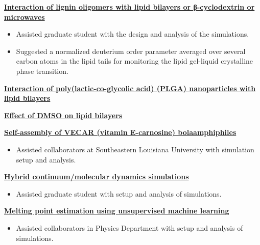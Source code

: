 \begin{cventries}
{\begin{cvitems}
\begin{itemize}
                \end{itemize}
            \item {\textbf{\underline{Interaction of lignin oligomers with lipid bilayers or β-cyclodextrin or microwaves}}}
                \begin{itemize}
                \item {Assisted graduate student with the design and analysis of the simulations.}
                \item {Suggested a normalized deuterium order parameter averaged over several carbon atoms in the lipid tails for monitoring the lipid gel-liquid crystalline phase transition.}
                \end{itemize}            
            \item {\textbf{\underline{Interaction of poly(lactic-co-glycolic acid) (PLGA) nanoparticles with lipid bilayers}}}
            \item {\textbf{\underline{Effect of DMSO on lipid bilayers}}}
            \item {\textbf{\underline{Self-assembly of VECAR (vitamin E-carnosine) bolaamphiphiles}}}
                \begin{itemize}
                \item {Assisted collaborators at Southeastern Louisiana University with simulation setup and analysis.}
                \end{itemize}
            \item {\textbf{\underline{Hybrid continuum/molecular dynamics simulations}}}
                \begin{itemize}
                \item {Assisted graduate student with setup and analysis of simulations.}
                \end{itemize}
            \item {\textbf{\underline{Melting point estimation using unsupervised machine learning}}}
                \begin{itemize}
                \item {Assisted collaborators in Physics Department with setup and analysis of simulations.}
                \end{itemize}
        \end{cvitems}
    }
    

\end{cventries}
